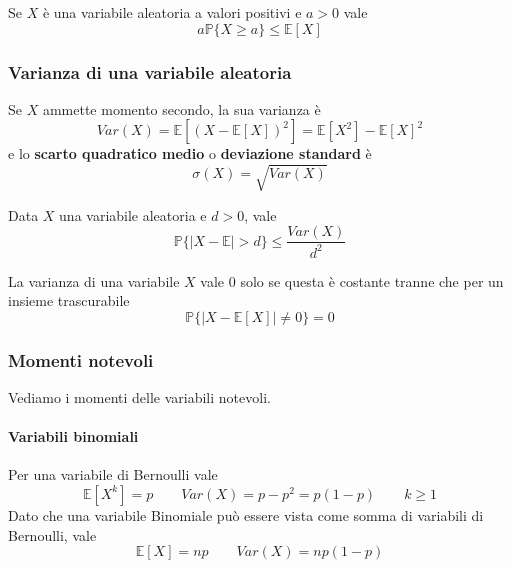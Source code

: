 \begin{proposition}
	Se $X$ è una variabile aleatoria a valori positivi e $a>0$ vale
	\begin{equation}
		a\mathbb{P}\{X \geq a\} \leq \mathbb{E}[X]
	\end{equation}
\end{proposition}

\subsubsection{Varianza di una variabile aleatoria}
\begin{definition} [Varianza]
	Se $X$ ammette momento secondo, la sua varianza è
	\begin{equation}
		Var(X) = \mathbb{E}[(X-\mathbb{E}[X])^2] = \mathbb{E}[X^2]-\mathbb{E}[X]^2
	\end{equation}
	e lo \textbf{scarto quadratico medio} o \textbf{deviazione standard} è
	\begin{equation}
		\sigma(X) = \sqrt{Var(X)}
	\end{equation}
\end{definition}

\begin{proposition}
	Data $X$ una variabile aleatoria e $d>0$, vale
	\begin{equation}
		\mathbb{P}\{\lvert X - \mathbb{E}\rvert > d\} \leq \frac{Var(X)}{d^2}
	\end{equation}
\end{proposition}

\begin{observation}
	La varianza di una variabile $X$ vale $0$ solo se questa è costante tranne che per un insieme trascurabile
	\begin{equation*}
		\mathbb{P}\{\lvert X - \mathbb{E}[X] \rvert \neq 0\} = 0
	\end{equation*}
\end{observation}

\subsubsection{Momenti notevoli}
Vediamo i momenti delle variabili notevoli.
\paragraph{Variabili binomiali}
Per una variabile di Bernoulli vale
\begin{equation}
	\mathbb{E}[X^k] = p \quad\quad Var(X)=p-p^2=p(1-p) \quad\quad k \geq 1
\end{equation}
Dato che una variabile Binomiale può essere vista come somma di variabili di Bernoulli, vale
\begin{equation}
	\mathbb{E}[X] = np \quad\quad Var(X) = np(1-p)
\end{equation}

